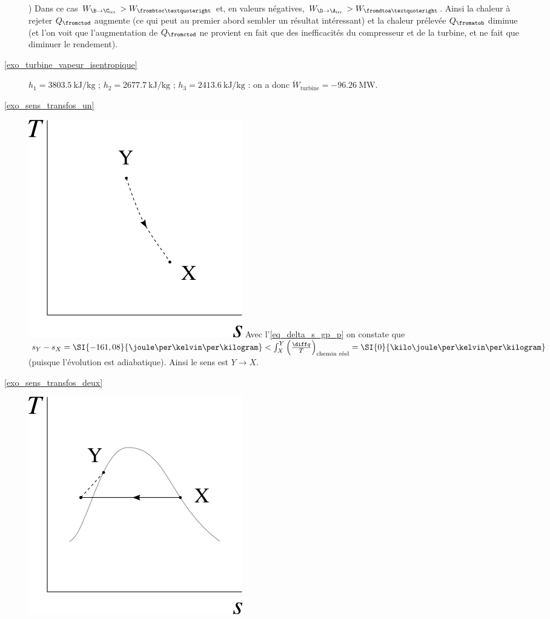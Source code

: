 \begin{description}
						) Dans ce cas $W_{\B\to\C_\text{irr.}} > W_{\frombtoc’}$ et, en valeurs négatives, $W_{\D\to\A_\text{irr.}} > W_{\fromdtoa’}$. Ainsi la chaleur à rejeter $Q_{\fromctod}$ augmente (ce qui peut au premier abord sembler un résultat intéressant) et la chaleur prélevée $Q_{\fromatob}$ diminue (et l’on voit que l’augmentation de $Q_{\fromctod}$ ne provient en fait que des inefficacités du compresseur et de la turbine, et ne fait que diminuer le rendement).
		\item [\ref{exo_turbine_vapeur_isentropique}]
						\tab $h_1 = \SI{3803,5}{\kilo\joule\per\kilogram}$ ; $h_2 = \SI{2677,7}{\kilo\joule\per\kilogram}$ ; $h_3 = \SI{2413,6}{\kilo\joule\per\kilogram}$ : on a donc $\dot{W}_\text{turbine} = \SI{-96,26}{\mega\watt}$.
		\item [\ref{exo_sens_transfos_un}]
						\includegraphics[width=\solutiondiagramwidth]{images/exo_sol_ts_bonsens1.png}
						\tab\tab Avec l’\cref{eq_delta_s_gp_p} on constate que $s_Y - s_X = \SI{-161,08}{\joule\per\kelvin\per\kilogram} < \int_X^Y \left(\frac{\diff q}{T}\right)_\text{chemin réel} = \SI{0}{\kilo\joule\per\kelvin\per\kilogram}$ (puisque l’évolution est adiabatique). Ainsi le sens est $Y\to X$.
		\item [\ref{exo_sens_transfos_deux}]
						\includegraphics[width=\solutiondiagramwidth]{images/exo_sol_ts_bonsens2.png}

\end{description}
